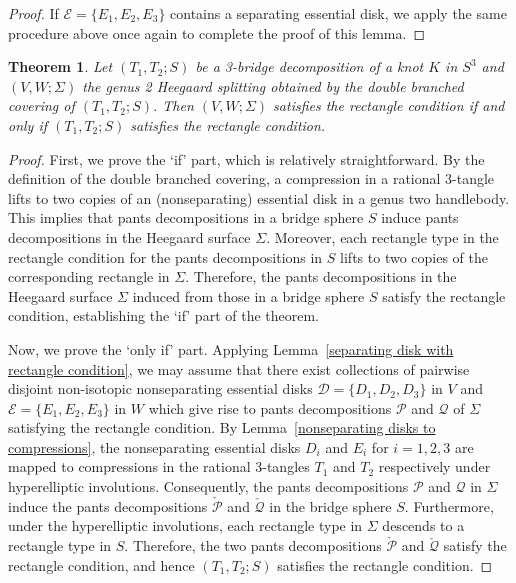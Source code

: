 \documentclass[12pt]{amsart}
\newtheorem{Thm}[theorem]{Theorem}
\begin{document}
\begin{proof}
If $\mathcal{E}=\{E_1, E_2, E_3\}$ contains a separating essential disk, we apply the same procedure above once again to complete the proof of this lemma.
\end{proof}



\begin{Thm}\label{main result-intro-1}
Let $(T_1, T_2; S)$ be a 3-bridge decomposition of a knot $K$ in $S^3$ and
$(V, W;\Sigma)$ the genus 2 Heegaard splitting obtained by the double branched covering of
$(T_1, T_2; S)$. Then $(V, W;\Sigma)$ satisfies the rectangle condition if and only if $(T_1, T_2; S)$ satisfies the rectangle condition.
\end{Thm}


\begin{proof}
First, we prove the `if' part, which is relatively straightforward. By the definition of the double branched covering, a compression in a rational 3-tangle lifts to two copies of an (nonseparating) essential disk in a genus two handlebody. This implies that pants decompositions in a bridge sphere $S$ induce pants decompositions in the Heegaard surface $\Sigma$.
Moreover, each rectangle type in the rectangle condition for the pants decompositions in $S$ lifts to two copies of the corresponding rectangle in $\Sigma$.
Therefore, the pants decompositions in the Heegaard surface $\Sigma$ induced from those in a bridge sphere $S$ satisfy the rectangle condition, establishing the `if' part of the theorem.

Now, we prove the `only if' part. Applying Lemma~\ref{separating disk with rectangle condition}, we may assume that there exist
collections of pairwise disjoint non-isotopic nonseparating essential disks $\mathcal{D}=\{D_1, D_2, D_3\}$ in $V$ and $\mathcal{E}=\{E_1, E_2, E_3\}$ in $W$
which give rise to pants decompositions $\mathcal{P}$ and $\mathcal{Q}$ of $\Sigma$ satisfying the rectangle condition.
By Lemma~\ref{nonseparating disks to compressions}, the nonseparating essential disks $D_i$ and $E_i$ for $i=1,2,3$ are mapped to compressions in the
rational 3-tangles $T_1$ and $T_2$ respectively under hyperelliptic involutions. Consequently, the pants decompositions $\mathcal{P}$ and $\mathcal{Q}$ in $\Sigma$
induce the pants decompositions $\mathcal{\check{P}}$ and $\mathcal{\check{Q}}$ in the bridge sphere $S$. Furthermore, under the hyperelliptic involutions,
each rectangle type in $\Sigma$ descends to a rectangle type in $S$. Therefore, the two pants decompositions $\mathcal{\check{P}}$ and $\mathcal{\check{Q}}$ satisfy the rectangle condition, and hence $(T_1, T_2; S)$ satisfies the rectangle condition.
\end{proof}
\end{document}
